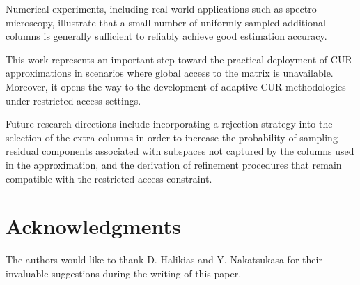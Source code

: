 \documentclass[11pt]{article}
\begin{document}
Numerical experiments, including real-world applications such as spectro-microscopy, illustrate that a small number of uniformly sampled additional columns is generally sufficient to reliably achieve good estimation accuracy.

This work represents an important step toward the practical deployment of CUR approximations in scenarios where global access to the matrix is unavailable. Moreover, it opens the way to the development of adaptive CUR methodologies under restricted-access settings.

Future research directions include incorporating a rejection strategy into the selection of the extra columns in order to increase the probability of sampling residual components associated with subspaces not captured by the columns used in the approximation, and the derivation of refinement procedures that remain compatible with the restricted-access constraint.
\section*{Acknowledgments}
The authors would like to thank D. Halikias and Y. Nakatsukasa for their invaluable suggestions during the writing of this paper.


%
\end{document}
